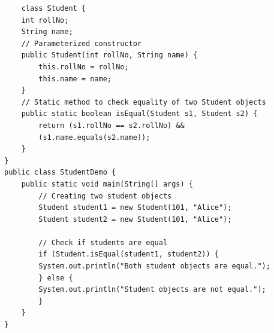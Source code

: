 \begin{verbatim}
    class Student {
    int rollNo;
    String name;
    // Parameterized constructor
    public Student(int rollNo, String name) {
        this.rollNo = rollNo;
        this.name = name;
    }
    // Static method to check equality of two Student objects
    public static boolean isEqual(Student s1, Student s2) {
        return (s1.rollNo == s2.rollNo) && 
        (s1.name.equals(s2.name));
    }
}
public class StudentDemo {
    public static void main(String[] args) {
        // Creating two student objects
        Student student1 = new Student(101, "Alice");
        Student student2 = new Student(101, "Alice");

        // Check if students are equal
        if (Student.isEqual(student1, student2)) {    
        System.out.println("Both student objects are equal.");
        } else {
        System.out.println("Student objects are not equal.");
        }
    }
}
\end{verbatim}